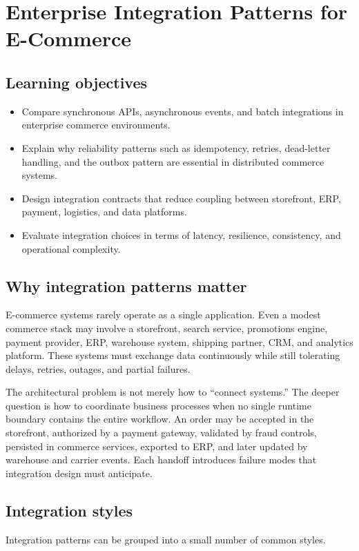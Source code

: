 \chapter{Enterprise Integration Patterns for E-Commerce}

\section{Learning objectives}
\begin{itemize}
  \item Compare synchronous APIs, asynchronous events, and batch integrations in enterprise commerce environments.
  \item Explain why reliability patterns such as idempotency, retries, dead-letter handling, and the outbox pattern are essential in distributed commerce systems.
  \item Design integration contracts that reduce coupling between storefront, ERP, payment, logistics, and data platforms.
  \item Evaluate integration choices in terms of latency, resilience, consistency, and operational complexity.
\end{itemize}

\section{Why integration patterns matter}
E-commerce systems rarely operate as a single application.
Even a modest commerce stack may involve a storefront, search service, promotions engine, payment provider, ERP, warehouse system, shipping partner, CRM, and analytics platform.
These systems must exchange data continuously while still tolerating delays, retries, outages, and partial failures.

The architectural problem is not merely how to ``connect systems.''
The deeper question is how to coordinate business processes when no single runtime boundary contains the entire workflow.
An order may be accepted in the storefront, authorized by a payment gateway, validated by fraud controls, persisted in commerce services, exported to ERP, and later updated by warehouse and carrier events.
Each handoff introduces failure modes that integration design must anticipate.

\section{Integration styles}
Integration patterns can be grouped into a small number of common styles.

